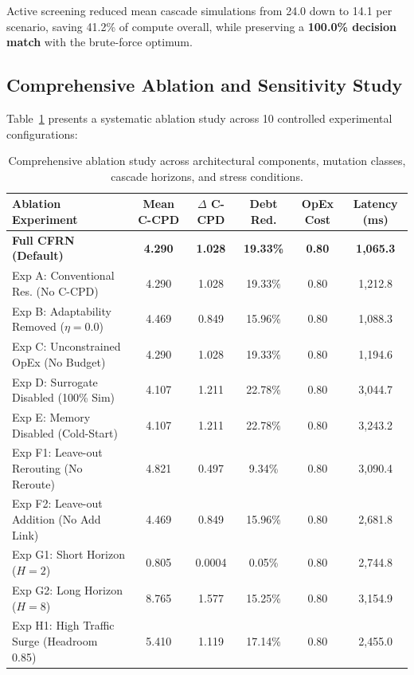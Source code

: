 \documentclass[pdflatex,sn-mathphys-num]{sn-jnl}
\theoremstyle{thmstyleone}
\theoremstyle{thmstyletwo}
\theoremstyle{thmstylethree}
\begin{document}
Active screening reduced mean cascade simulations from 24.0 down to 14.1 per scenario, saving 41.2\% of compute overall, while preserving a \textbf{100.0\% decision match} with the brute-force optimum.

\subsection{Comprehensive Ablation and Sensitivity Study}
Table~\ref{tab:ablation} presents a systematic ablation study across 10 controlled experimental configurations:

\begin{table}[t]
\centering
\caption{Comprehensive ablation study across architectural components, mutation classes, cascade horizons, and stress conditions.}
\label{tab:ablation}
\begin{tabular}{lccccc}
\toprule
\textbf{Ablation Experiment} & \textbf{Mean C-CPD} & \textbf{$\Delta$ C-CPD} & \textbf{Debt Red.} & \textbf{OpEx Cost} & \textbf{Latency (ms)} \\
\midrule
\textbf{Full CFRN (Default)} & \textbf{4.290} & \textbf{1.028} & \textbf{19.33\%} & \textbf{0.80} & \textbf{1,065.3} \\
Exp A: Conventional Res. (No C-CPD) & 4.290 & 1.028 & 19.33\% & 0.80 & 1,212.8 \\
Exp B: Adaptability Removed ($\eta = 0.0$) & 4.469 & 0.849 & 15.96\% & 0.80 & 1,088.3 \\
Exp C: Unconstrained OpEx (No Budget) & 4.290 & 1.028 & 19.33\% & 0.80 & 1,194.6 \\
Exp D: Surrogate Disabled (100\% Sim) & 4.107 & 1.211 & 22.78\% & 0.80 & 3,044.7 \\
Exp E: Memory Disabled (Cold-Start) & 4.107 & 1.211 & 22.78\% & 0.80 & 3,243.2 \\
Exp F1: Leave-out Rerouting (No Reroute) & 4.821 & 0.497 & 9.34\% & 0.80 & 3,090.4 \\
Exp F2: Leave-out Addition (No Add Link) & 4.469 & 0.849 & 15.96\% & 0.80 & 2,681.8 \\
Exp G1: Short Horizon ($H = 2$) & 0.805 & 0.0004 & 0.05\% & 0.80 & 2,744.8 \\
Exp G2: Long Horizon ($H = 8$) & 8.765 & 1.577 & 15.25\% & 0.80 & 3,154.9 \\
Exp H1: High Traffic Surge (Headroom 0.85) & 5.410 & 1.119 & 17.14\% & 0.80 & 2,455.0 \\
\bottomrule
\end{tabular}
\end{table}
\end{document}
